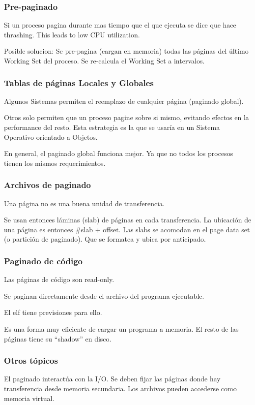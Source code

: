 \documentclass[a4paper, twoside]{article}
\begin{document}
\subsubsection{Pre-paginado}
Si un proceso pagina durante mas tiempo que el que ejecuta se dice que hace thrashing. This leads to low CPU utilization.

Posible solucion: Se pre-pagina (cargan en memoria) todas las páginas del último Working Set del proceso. Se re-calcula el Working Set a intervalos.

\subsubsection{Tablas de páginas Locales y Globales}
Algunos Sistemas permiten el reemplazo de cualquier página (paginado global).

Otros solo permiten que un proceso pagine sobre si mismo, evitando efectos en la performance del resto. Esta estrategia es la que se usaría en un Sistema Operativo orientado a Objetos.

En general, el paginado global funciona mejor. Ya que no todos los procesos tienen los mismos requerimientos.

\subsubsection{Archivos de paginado}
Una página no es una buena unidad de transferencia.

Se usan entonces láminas (slab) de páginas en cada transferencia. La ubicación de una página es entonces \#slab + offset. Las slabs se acomodan en el page data set (o partición de paginado). Que se formatea y ubica por anticipado.

\subsubsection{Paginado de código}
Las páginas de código son read-only.

Se paginan directamente desde el archivo del programa ejecutable.

El elf tiene previsiones para ello.

Es una forma muy eficiente de cargar un programa a memoria. El resto de las páginas tiene su ``shadow'' en disco.

\subsubsection{Otros tópicos}
El paginado interactúa con la I/O. Se deben fijar las páginas donde hay transferencia desde memoria secundaria. Los archivos pueden accederse como memoria virtual.
\end{document}
